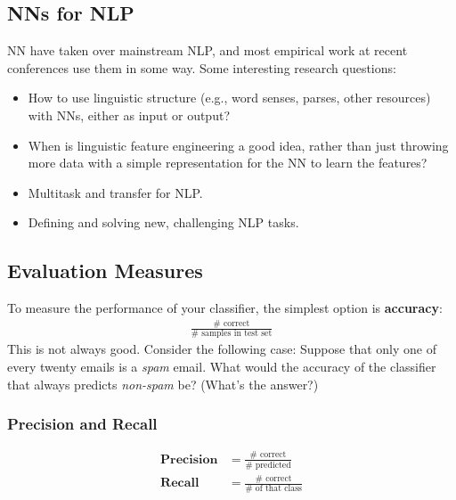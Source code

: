 \documentclass{article}
\begin{document}
\subsection{NNs for NLP}
NN have taken over mainstream NLP, and most empirical work at recent conferences use them in some way. Some interesting research questions:
\begin{itemize}
    \item How to use linguistic structure (e.g., word senses, parses, other resources) with NNs, either as input or output?
    \item When is linguistic feature engineering a good idea, rather than just throwing more data with a simple representation for the NN to learn the features?
    \item Multitask and transfer for NLP.
    \item Defining and solving new, challenging NLP tasks.
\end{itemize}
\subsection{Evaluation Measures}
To measure the performance of your classifier, the simplest option is \textbf{accuracy}:
\begin{align}
    \frac{\# \text{ correct}}{\# \text{ samples in test set}}
\end{align}
This is not always good. Consider the following case: Suppose that only one of every twenty emails is a \textit{spam} email. What would the accuracy of the classifier that always predicts \textit{non-spam} be? (What's the answer?)
\subsubsection{Precision and Recall}
\begin{align}
    \textbf{Precision} &= \frac{\# \text{ correct}}{\# \text{ predicted}}\\
    \textbf{Recall} &= \frac{\# \text{ correct}}{\# \text{ of that class}}
\end{align}
\end{document}
